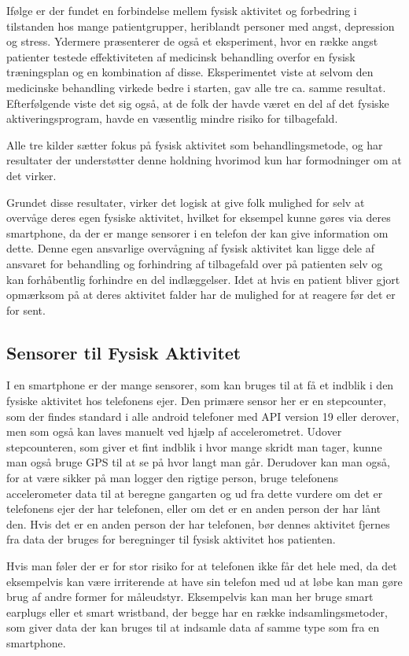 Ifølge \citet{book:sportPsyc} er der fundet en forbindelse mellem fysisk aktivitet og forbedring i tilstanden hos mange patientgrupper, heriblandt personer med angst, depression og stress.
Ydermere præsenterer de også et eksperiment, hvor en række angst patienter testede effektiviteten af medicinsk behandling overfor en fysisk træningsplan og en kombination af disse.
Eksperimentet viste at selvom den medicinske behandling virkede bedre i starten, gav alle tre ca. samme resultat.
Efterfølgende viste det sig også, at de folk der havde været en del af det fysiske aktiveringsprogram, havde en væsentlig mindre risiko for tilbagefald.

Alle tre kilder sætter fokus på fysisk aktivitet som behandlingsmetode, \citet{art:physMental} og \citet{book:sportPsyc} har resultater der understøtter denne holdning hvorimod \citet{misc:healthReports} kun har formodninger om at det virker.

Grundet disse resultater, virker det logisk at give folk mulighed for selv at overvåge deres egen fysiske aktivitet, hvilket for eksempel kunne gøres via deres smartphone, da der er mange sensorer i en telefon der kan give information om dette.
Denne egen ansvarlige overvågning af fysisk aktivitet kan ligge dele af ansvaret for behandling og forhindring af tilbagefald over på patienten selv og kan forhåbentlig forhindre en del indlæggelser.
Idet at hvis en patient bliver gjort opmærksom på at deres aktivitet falder har de mulighed for at reagere før det er for sent.

\subsection{Sensorer til Fysisk Aktivitet}
I en smartphone er der mange sensorer, som kan bruges til at få et indblik i den fysiske aktivitet hos telefonens ejer.
Den primære sensor her er en stepcounter, som der findes standard i alle android telefoner med API version 19 eller derover, men som også kan laves manuelt ved hjælp af accelerometret.
Udover stepcounteren, som giver et fint indblik i hvor mange skridt man tager, kunne man også bruge GPS til at se på hvor langt man går.
Derudover kan man også, for at være sikker på man logger den rigtige person, bruge telefonens accelerometer data til at beregne gangarten \citep{4272626} og ud fra dette vurdere om det er telefonens ejer der har telefonen, eller om det er en anden person der har lånt den.
Hvis det er en anden person der har telefonen, bør dennes aktivitet fjernes fra data der bruges for beregninger til fysisk aktivitet hos patienten.

Hvis man føler der er for stor risiko for at telefonen ikke får det hele med, da det eksempelvis kan være irriterende at have sin telefon med ud at løbe kan man gøre brug af andre former for måleudstyr.
Eksempelvis kan man her bruge smart earplugs eller et smart wristband, der begge har en række indsamlingsmetoder, som giver data der kan bruges til at indsamle data af samme type som fra en smartphone.